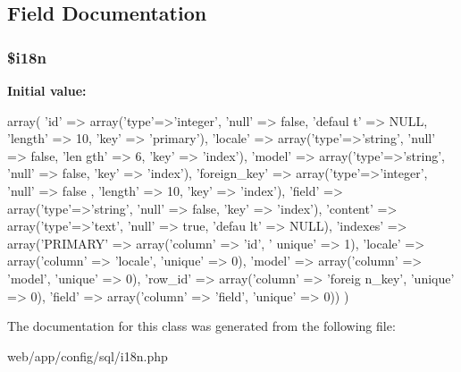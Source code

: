 \subsection{Field Documentation}
\hypertarget{classi18n_schema_a93ac093ed9c4497f0f02e1ebbee5335e}{
\subsubsection[{\$i18n}]{\setlength{\rightskip}{0pt plus 5cm}\$i18n}}
\label{classi18n_schema_a93ac093ed9c4497f0f02e1ebbee5335e}
{\bfseries Initial value:}
\begin{DoxyCode}
 array(
                        'id' => array('type'=>'integer', 'null' => false, 'defaul
      t' => NULL, 'length' => 10, 'key' => 'primary'),
                        'locale' => array('type'=>'string', 'null' => false, 'len
      gth' => 6, 'key' => 'index'),
                        'model' => array('type'=>'string', 'null' => false, 'key'
       => 'index'),
                        'foreign_key' => array('type'=>'integer', 'null' => false
      , 'length' => 10, 'key' => 'index'),
                        'field' => array('type'=>'string', 'null' => false, 'key'
       => 'index'),
                        'content' => array('type'=>'text', 'null' => true, 'defau
      lt' => NULL),
                        'indexes' => array('PRIMARY' => array('column' => 'id', '
      unique' => 1), 'locale' => array('column' => 'locale', 'unique' => 0), 'model' =>
       array('column' => 'model', 'unique' => 0), 'row_id' => array('column' => 'foreig
      n_key', 'unique' => 0), 'field' => array('column' => 'field', 'unique' => 0))
                )
\end{DoxyCode}


The documentation for this class was generated from the following file:\begin{DoxyCompactItemize}
\item 
web/app/config/sql/i18n.php\end{DoxyCompactItemize}
